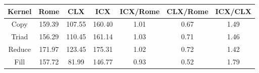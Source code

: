 \begin{tabular}{|c|c|c|c|c|c|c|}  \hline
Kernel&Rome&CLX&ICX & ICX/Rome & CLX/Rome & ICX/CLX \\ \hline 
Copy & 159.39 & 107.55 & 160.40  & 1.01 & 0.67 & 1.49 \\ \hline 
Triad & 156.29 & 110.45 & 161.14  & 1.03 & 0.71 & 1.46 \\ \hline 
Reduce & 171.97 & 123.45 & 175.31  & 1.02 & 0.72 & 1.42 \\ \hline 
Fill & 157.72 & 81.99 & 146.77  & 0.93 & 0.52 & 1.79 \\ \hline 
\end{tabular}
